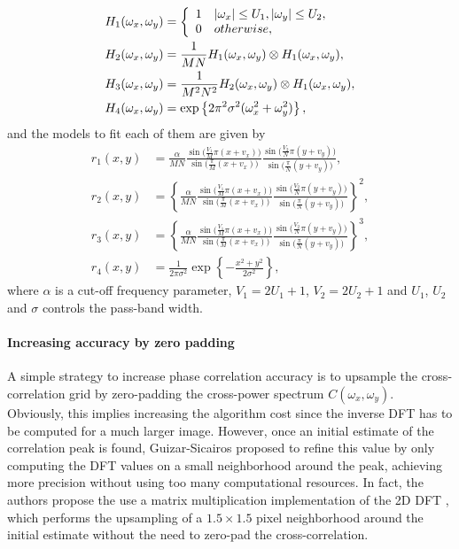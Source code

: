 \begin{align}
H_1(\omega_x, \omega_y)	&= \left\{
\begin{array}{l l}
1 & |\omega_x| \leq U_1, |\omega_y| \leq U_2,\\
0 & otherwise,	
\end{array}
\right. \\
H_2(\omega_x, \omega_y)	&= \frac{1}{MN}H_1(\omega_x,\omega_y) \otimes H_1(\omega_x,\omega_y),\\
H_3(\omega_x, \omega_y)	&= \frac{1}{M^2N^2}H_2(\omega_x,\omega_y) \otimes H_1(\omega_x,\omega_y),\\
H_4(\omega_x, \omega_y) &= \exp\left\{\-2\pi^2\sigma^2(\omega_x^2 + \omega_y^2)\right\},
\end{align}
and the models to fit each of them are given by
\begin{align}
r_1(x,y) &= \frac{\alpha}{MN}\frac{\sin\big(\frac{V_1}{M}\pi(x\!+\!v_x)\big)}{\sin\big(\frac{\pi}{M}(x\!+\!v_x)\big)}\frac{\sin\big(\frac{V_2}{N}\pi(y\!+\!v_y)\big)}{\sin\big(\frac{\pi}{N}(y\!+\!v_y)\big)},	\\
r_2(x,y) &= \left\{\frac{\alpha}{MN}\frac{\sin\big(\frac{V_1}{M}\pi(x\!+\!v_x)\big)}{\sin\big(\frac{\pi}{M}(x\!+\!v_x)\big)}\frac{\sin\big(\frac{V_2}{N}\pi(y\!+\!v_y)\big)}{\sin\big(\frac{\pi}{N}(y\!+\!v_y)\big)}	\right\}^2,\\
r_3(x,y) &= \left\{\frac{\alpha}{MN}\frac{\sin\big(\frac{V_1}{M}\pi(x\!+\!v_x)\big)}{\sin\big(\frac{\pi}{M}(x\!+\!v_x)\big)}\frac{\sin\big(\frac{V_2}{N}\pi(y\!+\!v_y)\big)}{\sin\big(\frac{\pi}{N}(y\!+\!v_y)\big)}	\right\}^3,\\
r_4(x,y) &= \frac{1}{2\pi\sigma^2}\exp\left\{-\frac{x^2+y^2}{2\sigma^2}\right\},
\end{align}
where $\alpha$ is a cut-off frequency parameter, $V_1 = 2U_1 + 1$, $V_2 = 2U_2 + 1$ and $U_1$, $U_2$ and $\sigma$ controls the pass-band width.

\paragraph{Increasing accuracy by zero padding}
A simple strategy to increase phase correlation accuracy is to upsample the cross-correlation grid by zero-padding the cross-power spectrum $C(\omega_x, \omega_y)$. Obviously, this implies increasing the algorithm cost since the inverse DFT has to be computed for a much larger image. However, once an initial estimate of the correlation peak is found, Guizar-Sicairos \cite{Guizar-Sicairos08} proposed to refine this value by only computing the DFT values on a small neighborhood around the peak, achieving more precision without using too many computational resources. In fact, the authors propose the use a matrix multiplication implementation of the 2D DFT \cite{Soummer_07}, which performs the upsampling of a $1.5 \times 1.5$ pixel neighborhood around the initial estimate without the need to zero-pad the cross-correlation.

